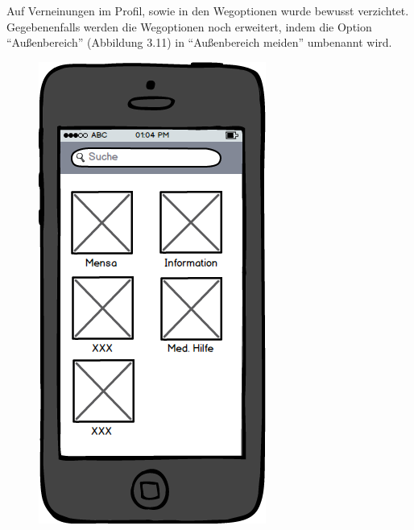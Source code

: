 Auf Verneinungen im Profil, sowie in den Wegoptionen wurde bewusst verzichtet. Gegebenenfalls werden die Wegoptionen noch erweitert, indem die Option "`Außenbereich"' (Abbildung 3.11) in "`Außenbereich meiden"' umbenannt wird.

\begin{figure}[ht]
\centering
\begin{minipage}[b]{.5\textwidth}
  \centering
  \includegraphics[width=.8\linewidth]{img/menu-mockup.png}
  \label{img:menu-mockup}
\end{minipage}%
\begin{minipage}[b]{.5\textwidth}

\end{minipage}
\end{figure}
